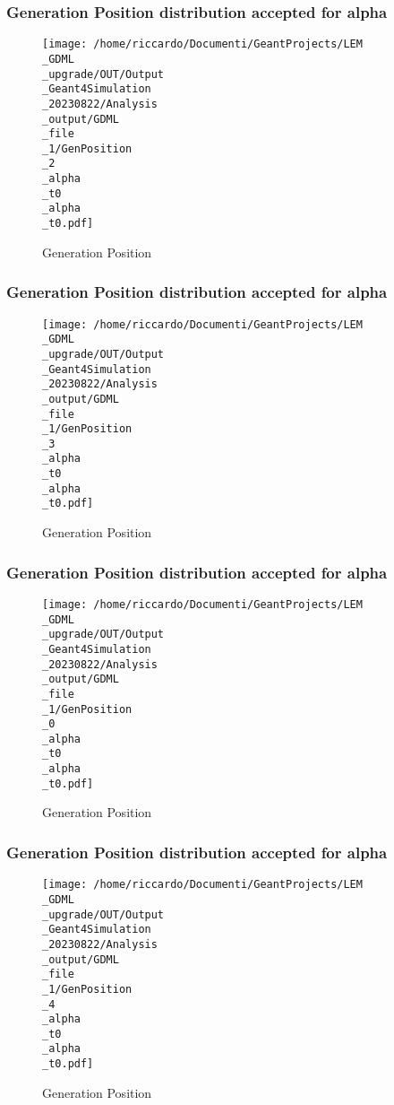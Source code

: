 \documentclass[8pt]{beamer}
\begin{document}
            \begin{frame}
                \frametitle{Generation Position distribution accepted for alpha}
            
        \begin{figure}[h]
            \centering
            \texttt{[image: /home/riccardo/Documenti/GeantProjects/LEM\\\_GDML\\\_upgrade/OUT/Output\\\_Geant4Simulation\\\_20230822/Analysis\\\_output/GDML\\\_file\\\_1/GenPosition\\\_2\\\_alpha\\\_t0\\\_alpha\\\_t0.pdf]}
            \caption{Generation Position}
        \end{figure}
        
            \end{frame}
            
            \begin{frame}
                \frametitle{Generation Position distribution accepted for alpha}
            
        \begin{figure}[h]
            \centering
            \texttt{[image: /home/riccardo/Documenti/GeantProjects/LEM\\\_GDML\\\_upgrade/OUT/Output\\\_Geant4Simulation\\\_20230822/Analysis\\\_output/GDML\\\_file\\\_1/GenPosition\\\_3\\\_alpha\\\_t0\\\_alpha\\\_t0.pdf]}
            \caption{Generation Position}
        \end{figure}
        
            \end{frame}
            
            \begin{frame}
                \frametitle{Generation Position distribution accepted for alpha}
            
        \begin{figure}[h]
            \centering
            \texttt{[image: /home/riccardo/Documenti/GeantProjects/LEM\\\_GDML\\\_upgrade/OUT/Output\\\_Geant4Simulation\\\_20230822/Analysis\\\_output/GDML\\\_file\\\_1/GenPosition\\\_0\\\_alpha\\\_t0\\\_alpha\\\_t0.pdf]}
            \caption{Generation Position}
        \end{figure}
        
            \end{frame}
            
            \begin{frame}
                \frametitle{Generation Position distribution accepted for alpha}
            
        \begin{figure}[h]
            \centering
            \texttt{[image: /home/riccardo/Documenti/GeantProjects/LEM\\\_GDML\\\_upgrade/OUT/Output\\\_Geant4Simulation\\\_20230822/Analysis\\\_output/GDML\\\_file\\\_1/GenPosition\\\_4\\\_alpha\\\_t0\\\_alpha\\\_t0.pdf]}
            \caption{Generation Position}
        \end{figure}
        
            \end{frame}
            
\end{document}
